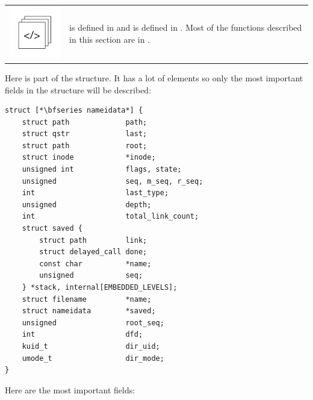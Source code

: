 \begin{table}[h]
\begin{tabular}{ll}
\parbox[l]{0.6in}{\includegraphics[scale=0.8]{figures/src-xref.pdf}} & \parbox[l]{4in}{\small{ is defined in  and  is defined in . Most of the functions described in this section are in .}}
\end{tabular}
\end{table}

\noindent
Here is part of the  structure. It has a lot of elements so only the most important fields in the structure will be described:

\begin{lstlisting}
struct [*\bfseries nameidata*] {
    struct path             path;
    struct qstr             last;
    struct path             root;
    struct inode            *inode;
    unsigned int            flags, state;
    unsigned                seq, m_seq, r_seq;
    int                     last_type;
    unsigned                depth;
    int                     total_link_count;
    struct saved {
        struct path         link;
        struct delayed_call done;
        const char          *name;
        unsigned            seq;
    } *stack, internal[EMBEDDED_LEVELS];
    struct filename         *name;
    struct nameidata        *saved;
    unsigned                root_seq;
    int                     dfd;
    kuid_t                  dir_uid;
    umode_t                 dir_mode;
} 
\end{lstlisting}

\noindent
Here are the most important fields:

